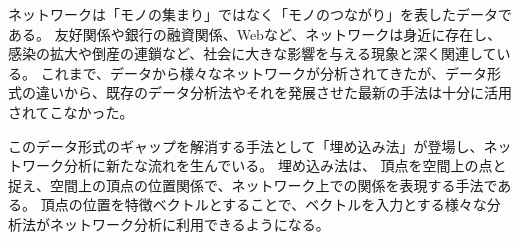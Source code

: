 \documentclass[J]{scitrans}
\def\ddash{\rule[0.33zh]{2zw}{.03zh}}
\begin{document}
ネットワークは「モノの集まり」ではなく「モノのつながり」を表したデータである。
友好関係や銀行の融資関係、Webなど、ネットワークは身近に存在し、感染の拡大や倒産の連鎖など、社会に大きな影響を与える現象と深く関連している。
これまで、データから様々なネットワークが分析されてきたが、データ形式の違いから、既存のデータ分析法やそれを発展させた最新の手法は十分に活用されてこなかった。%

%

%

このデータ形式のギャップを解消する手法として「埋め込み法」が登場し、ネットワーク分析に新たな流れを生んでいる。
埋め込み法は、 頂点を空間上の点と捉え、空間上の頂点の位置関係で、ネットワーク上での関係を表現する手法である。
頂点の位置を特徴ベクトルとすることで、ベクトルを入力とする様々な分析法がネットワーク分析に利用できるようになる。
\end{document}

